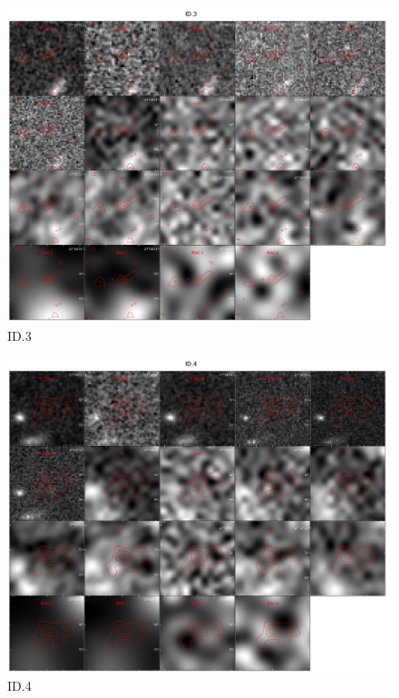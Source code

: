 \begin{figure}[tbp]
\centering \includegraphics[width=160mm]{Matched/ASPECS_Cutout_2.jpg}
\caption{ID.3}
\label{fig:Match_Three}
\end{figure}

\begin{figure}[tbp]
\centering \includegraphics[width=160mm]{Matched/ASPECS_Cutout_3.jpg}
\caption{ID.4}
\label{fig:Match_Three}
\end{figure}

